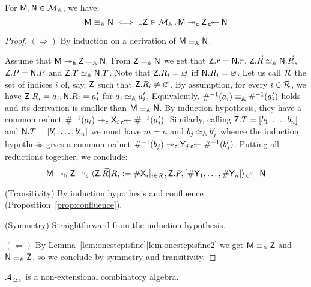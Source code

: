 \begin{thm}\label{thm:CR}
For $\mM,\mN\in\cM$, we have:
\[
	\mM\equiva \mN\iff \exists \mZ\in\cM\,.\, \mM\redd\mZ\invredd[\mach{c}] \mN
\]
\end{thm}

\begin{proof} $(\Rightarrow)$ By induction on a derivation of $\mM\equiva \mN$.

\redrule{} Assume that $\mM\reddh\mZ=_\Addrs \mN$. From $\mZ=_\Addrs \mN$ we get that $\mZ.r = \mN.r$, $\mZ.\vec R\sima \mN.\vec R$, $\mZ.P = \mN.P$ and $\mZ.T\sima\mN.T$. Note that $\mZ.R_i =\Null$ iff $\mN.R_i = \Null$.
Let us call $\cR$ the set of indices $i$ of, say, $\mZ$ such that $\mZ.R_i\neq\Null$.
By assumption, for every $i\in\cR$, we have $\mZ.R_i =a_i,\mN.R_i = a'_i$ for $a_i\sima a'_i$. Equivalently, $\Lookinv{a_i}\equiva\Lookinv{a'_i}$ holds and its derivation is smaller than $\mM\equiva \mN$. By induction hypothesis, they have a common reduct $\Lookinv{a_i}\redd \mach{X}_i\invredd[\mach{c}]\Lookinv{a'_i}$.
Similarly, calling $\mZ.T = [b_1,\dots,b_n]$ and $\mN.T = [b'_1,\dots,b'_m]$ we must have $m = n$ and $b_j\sima b'_j$ whence the induction hypothesis gives a common reduct $\Lookinv{b_j}\redd \mach{Y}_j \invredd[\mach{c}]\Lookinv{b'_j}$.
Putting all reductions together, we conclude:
\[
\mM\reddh \mZ\redd \tuple{\mZ.\vec R\repl{R_i}{\Lookup{\mach{X}_i}}_{i\in\cR},\mZ.P,[\Lookup{\mach{Y}_1},\dots,\Lookup{\mach{Y}_n}]} \invredd[\mach{c}]\mN
\]


(Transitivity) By induction hypothesis and confluence (Proposition~\ref{prop:confluence}).

(Symmetry) Straightforward from the induction hypothesis.

$(\Leftarrow)$ By Lemma~\ref{lem:onestepisfine}\ref{lem:onestepisfine2} we get $\mM\equiva\mZ$ and $\mN\equiva \mZ$, so we conclude by symmetry and transitivity.
\end{proof}

\begin{prop}\label{prop:cAisnonextcombal}
$\cA_{\,\sima}$ is a non-extensional combinatory algebra.
\end{prop}

